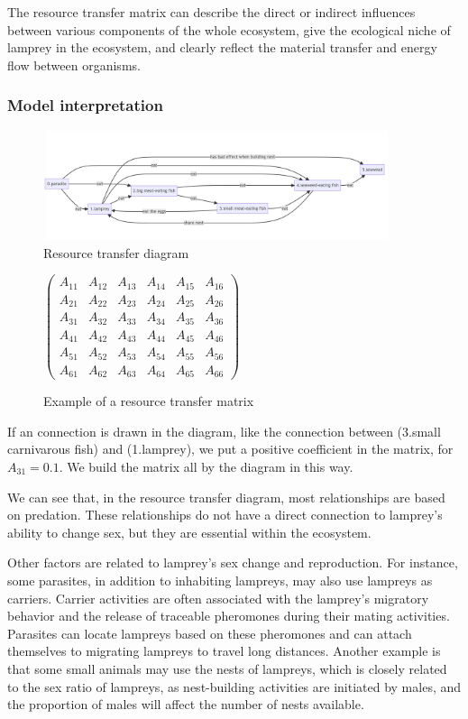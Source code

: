 \documentclass[12pt]{article}
\begin{document}
The resource transfer matrix can describe the direct or indirect influences between various
components of the whole ecosystem, give the ecological niche of lamprey in the ecosystem,
and clearly reflect the material transfer and energy flow between organisms.
\subsubsection{Model interpretation}
\begin{figure}[ht]
	\centering
	\includegraphics[width=0.9\textwidth]{Q4_EnvStructure.png}
	\caption{Resource transfer diagram}
\end{figure}
\begin{figure}[ht]
	\centering
	$\begin{pmatrix}
			A_{11} & A_{12} & A_{13} & A_{14} & A_{15} & A_{16} \\
			A_{21} & A_{22} & A_{23} & A_{24} & A_{25} & A_{26} \\
			A_{31} & A_{32} & A_{33} & A_{34} & A_{35} & A_{36} \\
			A_{41} & A_{42} & A_{43} & A_{44} & A_{45} & A_{46} \\
			A_{51} & A_{52} & A_{53} & A_{54} & A_{55} & A_{56} \\
			A_{61} & A_{62} & A_{63} & A_{64} & A_{65} & A_{66}
		\end{pmatrix}$
	\caption*{Example of a resource transfer matrix}
\end{figure}

If an connection is drawn in the diagram, like the connection between (3.small carnivarous
fish) and (1.lamprey), we put a positive coefficient in the matrix, for $A_{31} = 0.1$.
We build the matrix all by the diagram in this way.

We can see that, in the resource transfer diagram, most relationships are based on predation.
These relationships do not have a direct connection to lamprey's ability to change sex, but
they are essential within the ecosystem.

Other factors are related to lamprey's sex change and reproduction. For instance, some parasites,
in addition to inhabiting lampreys, may also use lampreys as carriers. Carrier activities are
often associated with the lamprey's migratory behavior and the release of traceable pheromones
during their mating activities. Parasites can locate lampreys based on these pheromones and
can attach themselves to migrating lampreys to travel long distances. Another example is that
some small animals may use the nests of lampreys, which is closely related to the sex ratio of
lampreys, as nest-building activities are initiated by males, and the proportion of males will
affect the number of nests available.
\end{document}
